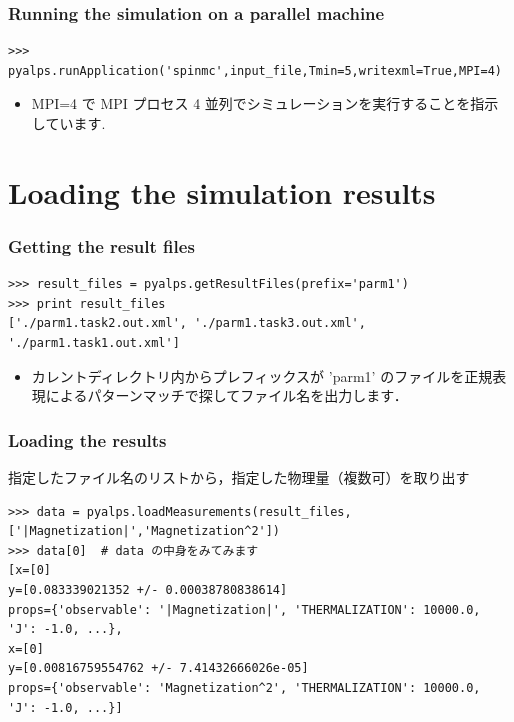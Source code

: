 \begin{frame}[t,fragile]
\frametitle{Running the simulation on a parallel machine}
\begin{lstlisting}
>>> pyalps.runApplication('spinmc',input_file,Tmin=5,writexml=True,MPI=4)
\end{lstlisting}
\begin{itemize}
\item MPI=4 で MPI プロセス 4 並列でシミュレーションを実行することを指示しています.
\end{itemize}

\end{frame}

\section{Loading the simulation results}
\begin{frame}[t,fragile]
\frametitle{Getting the result files}
\begin{lstlisting}
>>> result_files = pyalps.getResultFiles(prefix='parm1')
>>> print result_files
['./parm1.task2.out.xml', './parm1.task3.out.xml', './parm1.task1.out.xml']
\end{lstlisting}
\begin{itemize}
\item カレントディレクトリ内からプレフィックスが 'parm1' のファイルを正規表現によるパターンマッチで探してファイル名を出力します．
\end{itemize}

\end{frame}

\begin{frame}[t,fragile]
\frametitle{Loading the results}
指定したファイル名のリストから，指定した物理量（複数可）を取り出す
\begin{lstlisting}
>>> data = pyalps.loadMeasurements(result_files,['|Magnetization|','Magnetization^2'])
>>> data[0]  # data の中身をみてみます
[x=[0]
y=[0.083339021352 +/- 0.00038780838614]
props={'observable': '|Magnetization|', 'THERMALIZATION': 10000.0, 'J': -1.0, ...}, 
x=[0]
y=[0.00816759554762 +/- 7.41432666026e-05]
props={'observable': 'Magnetization^2', 'THERMALIZATION': 10000.0, 'J': -1.0, ...}]
\end{lstlisting}
\end{frame}

